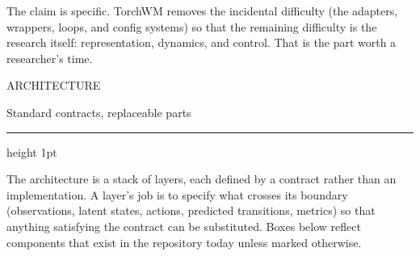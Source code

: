 \documentclass[10pt,a4paper]{article}
\newcommand{\kicker}[1]{{\footnotesize\displayfont\color{accent}\MakeUppercase{#1}}}
\newcommand{\pagetitle}[2]{%
  \kicker{#1}\par\vspace{1.5mm}
  {\Huge\displayfont\color{ink} #2}\par\vspace{2.5mm}
  {\color{rule}\hrule height 1pt}\par\vspace{4mm}}
\begin{document}
\vspace{3mm}
{\footnotesize
The claim is specific. TorchWM removes the incidental difficulty (the adapters, wrappers, loops,
and config systems) so that the remaining difficulty is the research itself: representation,
dynamics, and control. That is the part worth a researcher's time.}

\newpage
\pagetitle{Architecture}{Standard contracts, replaceable parts}

{\footnotesize
The architecture is a stack of layers, each defined by a contract rather than an implementation.
A layer's job is to specify what crosses its boundary (observations, latent states, actions,
predicted transitions, metrics) so that anything satisfying the contract can be substituted.
Boxes below reflect components that exist in the repository today unless marked otherwise.}

\vspace{3.5mm}
\end{document}
